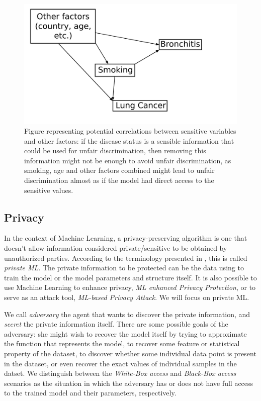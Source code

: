 \begin{figure}[ht]
\centering
\includegraphics[width=\textwidth]{correlated}
\caption{Figure representing potential correlations between sensitive variables and other factors: if the disease status is a sensible information that could be used for unfair discrimination, then removing this information might not be enough to avoid unfair discrimination, as smoking, age and other factors combined might lead to unfair discrimination almost as if the model had direct access to the sensitive values.}\label{fig:correlated}
\end{figure}

\subsection{Privacy}

In the context of Machine Learning, a privacy-preserving algorithm is one that doesn't allow information considered private/sensitive to be obtained by unauthorized parties. According to the terminology presented in \cite{liu2021machine}, this is called \emph{private ML}. The private information to be protected can be the data using to train the model or the model parameters and structure itself. It is also possible to use Machine Learning to enhance privacy, \emph{ML enhanced Privacy Protection}, or to serve as an attack tool, \emph{ML-based Privacy Attack}. We will focus on private ML.

We call \emph{adversary} the agent that wants to discover the private information, and \emph{secret} the private information itself. There are some possible goals of the adversary: she might wish to recover the model itself by trying to approximate the function that represents the model, to recover some feature or statistical property of the dataset, to discover whether some individual data point is present in the dataset, or even recover the exact values of individual samples in the datset. We distinguish between the \emph{White-Box access} and \emph{Black-Box access} scenarios as the situation in which the adversary has or does not have full access to the trained model and their parameters, respectively. 

